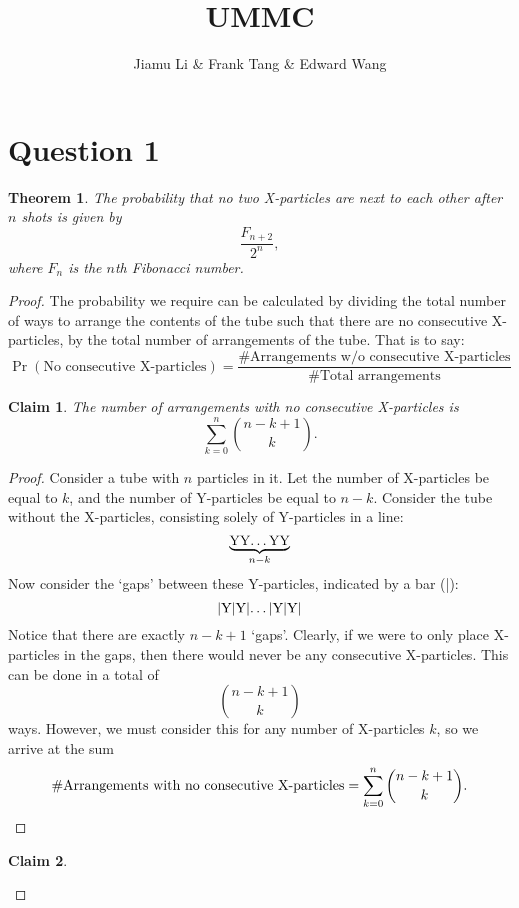 \documentclass{article}
\title{UMMC}
\author{Jiamu Li \& Frank Tang \& Edward Wang}
\newtheorem{theorem}{Theorem}
\newtheorem{claim}{Claim}[theorem]
\DeclareMathOperator{\prob}{Pr}
\begin{document}
\maketitle

\section{Question 1}

\begin{theorem}
  The probability that no two X-particles are next to each other after $n$ shots is given by \[
    \frac{F_{n+2}}{2^n},
\] where $F_n$ is the $n$th Fibonacci number.
\end{theorem}
\begin{proof}
The probability we require can be calculated by dividing the total number of ways to arrange the contents of the tube such that there are no consecutive X-particles, by the total number of arrangements of the tube. That is to say:
\begin{equation*}
  \prob(\text{No consecutive X-particles}) = \frac{\# \text{Arrangements w/o consecutive X-particles}}{\# \text{Total arrangements}}
\end{equation*}
\begin{claim}
  The number of arrangements with no consecutive X-particles is \[
    \sum_{k=0}^n \binom{n-k+1}{k}.
  \]
\end{claim}
\begin{proof}
  Consider a tube with $n$ particles in it. Let the number of X-particles be equal to $k$, and the number of Y-particles be equal to $n-k$. Consider the tube without the X-particles, consisting solely of Y-particles in a line:
  \begin{equation}
    \underbrace{\text{YY\dots YY}}_{n-k}
  \end{equation}
  Now consider the `gaps' between these Y-particles, indicated by a bar (|):
  \begin{equation}
    \text{|Y|Y|\dots |Y|Y|}
  \end{equation}
  Notice that there are exactly $n-k+1$ `gaps'. Clearly, if we were to only place X-particles in the gaps, then there would never be any consecutive X-particles. This can be done in a total of \[
    \binom{n-k+1}{k}
    \] ways. However, we must consider this for any number of X-particles $k$, so we arrive at the sum \[
    \#\text{Arrangements with no consecutive X-particles} = \sum_{k=0}^n \binom{n-k+1}{k}. \qedhere
  \]
\end{proof}
\begin{claim}

\end{claim}
\end{proof}
\end{document}
